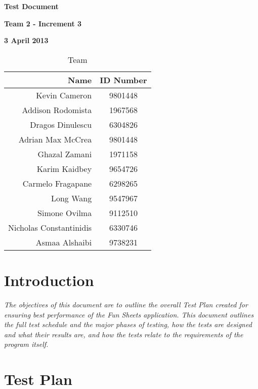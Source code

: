 \documentclass[12pt]{article}
\begin{document}
\vspace*{0.5in}
\centerline{\bf\Large Test Document}

\vspace*{0.5in}
\centerline{\bf\Large Team 2 - Increment 3}

\vspace*{0.5in}
\centerline{\bf\Large 3 April 2013}

\vspace*{1.5in}
\begin{table}[htbp]
\caption{Team}
\begin{center}
\begin{tabular}{|r | c|}
\hline
Name & ID Number \\\hline\hline
Kevin Cameron & 9801448 \\\hline\hline
Addison Rodomista & 1967568 \\\hline\hline
Dragos Dinulescu & 6304826 \\\hline\hline
Adrian Max McCrea & 9801448 \\\hline\hline
Ghazal Zamani & 1971158 \\\hline\hline
Karim Kaidbey & 9654726 \\\hline\hline
Carmelo Fragapane & 6298265 \\\hline\hline
Long Wang & 9547967 \\\hline\hline
Simone Ovilma & 9112510 \\\hline\hline
Nicholas Constantinidis & 6330746 \\\hline\hline
Asmaa Alshaibi & 9738231 \\\hline
\end{tabular}
\end{center}
\end{table}

\clearpage




\section{Introduction}

{\it
The objectives of this document are to outline the overall Test Plan created for ensuring best performance of the Fun Sheets application. This document outlines the full test schedule and the major phases of testing, how the tests are designed and what their results are, and how the tests relate to the requirements of the program itself. 
}

\section{Test Plan}
\end{document}

